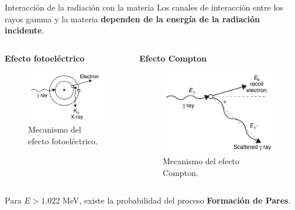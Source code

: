 \documentclass[9pt]{beamer}
\begin{document}
\begin{frame}{Interacción de la radiación con la materia}
\justifying Los canales de interacción entre los rayos gamma y la materia \textbf{dependen de la energía de la radiación incidente}.
	\begin{columns}
		\begin{column}{0.49\textwidth}
		\begin{center}
		\textbf{Efecto fotoeléctrico}
		\begin{figure}
		\includegraphics[height = 0.3\textheight]{Imagenes/Photoelectric-2.png}
		\caption{\justifying Mecanismo del efecto fotoeléctrico\footnotemark[1].}
		\end{figure}
		\end{center}			
		\end{column}
		\begin{column}{0.49\textwidth}  
		\begin{center}
		\textbf{Efecto Compton}
		\begin{figure}
		\includegraphics[height = 0.3\textheight]{Imagenes/Compton.png}
		\caption{\justifying Mecanismo del efecto Compton\footnotemark[1].}
		\end{figure}
		\end{center}
		\end{column}
	\end{columns}
Para $E >1.022$ MeV, existe la probabilidad del proceso \textbf{Formación de Pares}.
	
\end{frame}
\end{document}
